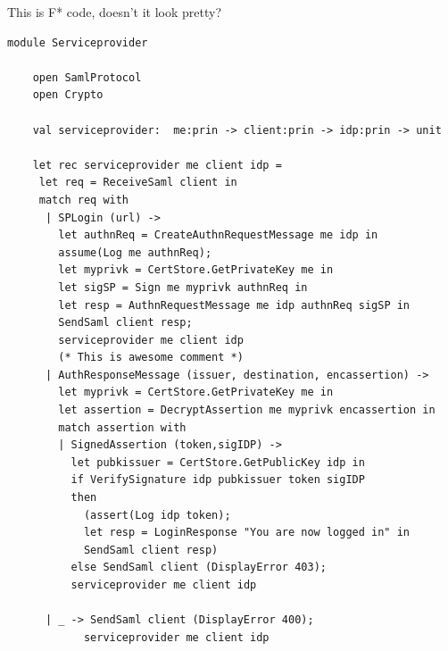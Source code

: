 \documentclass[twosided]{report}
\begin{document}
This is F* code, doesn't it look pretty?
\newpage
\begin{lstlisting}[style=fstar, caption={ServiceProvider Module}]
	module Serviceprovider
	
	open SamlProtocol
	open Crypto
	
	val serviceprovider:  me:prin -> client:prin -> idp:prin -> unit
	
	let rec serviceprovider me client idp = 
	 let req = ReceiveSaml client in
	 match req with
	  | SPLogin (url) ->
	    let authnReq = CreateAuthnRequestMessage me idp in
	    assume(Log me authnReq);
	    let myprivk = CertStore.GetPrivateKey me in
	    let sigSP = Sign me myprivk authnReq in
	    let resp = AuthnRequestMessage me idp authnReq sigSP in 
	    SendSaml client resp;
	    serviceprovider me client idp
		(* This is awesome comment *)
	  | AuthResponseMessage (issuer, destination, encassertion) -> 
	    let myprivk = CertStore.GetPrivateKey me in
	    let assertion = DecryptAssertion me myprivk encassertion in
	    match assertion with
	    | SignedAssertion (token,sigIDP) ->
	      let pubkissuer = CertStore.GetPublicKey idp in
	      if VerifySignature idp pubkissuer token sigIDP
	      then
	        (assert(Log idp token);
	        let resp = LoginResponse "You are now logged in" in
	        SendSaml client resp)
	      else SendSaml client (DisplayError 403);
	      serviceprovider me client idp
	  
	  | _ -> SendSaml client (DisplayError 400);
	        serviceprovider me client idp
\end{lstlisting}
\end{document}
